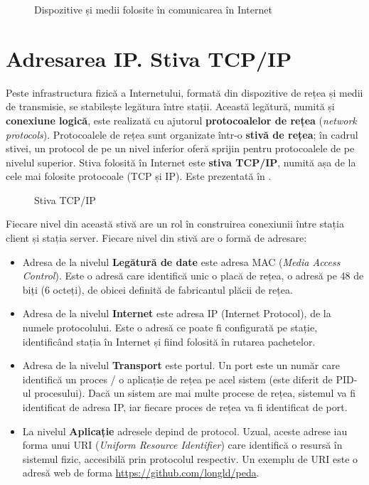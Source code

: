 \begin{figure}[htbp]
  \centering
  \def\svgwidth{\columnwidth}
  
  \caption{Dispozitive și medii folosite în comunicarea în Internet}
  \label{fig:net:device-connect}
\end{figure}

\section{Adresarea IP. Stiva TCP/IP}
\label{sec:net:tcp-ip}

Peste infrastructura fizică a Internetului, formată din dispozitive de rețea și medii de transmisie, se stabilește legătura între stații.
Această legătură, numită și \textbf{conexiune logică}, este realizată cu ajutorul \textbf{protocoalelor de rețea} (\textit{network protocols}).
Protocoalele de rețea sunt organizate într-o \textbf{stivă de rețea};
în cadrul stivei, un protocol de pe un nivel inferior oferă sprijin pentru protocoalele de pe nivelul superior.
Stiva folosită în Internet este \textbf{stiva TCP/IP}, numită așa de la cele mai folosite protocoale (TCP și IP).
Este prezentată în .

\begin{figure}[htbp]
  \centering
  \def\svgwidth{\columnwidth}
  
  \caption{Stiva TCP/IP}
  \label{fig:net:tcp-ip-stack}
\end{figure}

Fiecare nivel din această stivă are un rol în construirea conexiunii între stația client și stația server.
Fiecare nivel din stivă are o formă de adresare:

\begin{itemize}
  \item Adresa de la nivelul \textbf{Legătură de date} este adresa MAC (\textit{Media Access Control}).
    Este o adresă care identifică unic o placă de rețea, o adresă pe 48 de biți (6 octeți), de obicei definită de fabricantul plăcii de rețea.
  \item Adresa de la nivelul \textbf{Internet} este adresa IP (Internet Protocol), de la numele protocolului. Este o adresă ce poate fi configurată pe stație, identificând stația în Internet și fiind folosită în rutarea pachetelor.
  \item Adresa de la nivelul \textbf{Transport} este portul. Un port este un număr care identifică un proces / o aplicație de rețea pe acel sistem (este diferit de PID-ul procesului).
    Dacă un sistem are mai multe procese de rețea, sistemul va fi identificat de adresa IP, iar fiecare proces de rețea va fi identificat de port.
  \item La nivelul \textbf{Aplicație} adresele depind de protocol.
    Uzual, aceste adrese iau forma unui URI (\textit{Uniform Resource Identifier}) care identifică o resursă în sistemul fizic, accesibilă prin protocolul respectiv.
    Un exemplu de URI este o adresă web de forma \url{https://github.com/longld/peda}.
\end{itemize}

